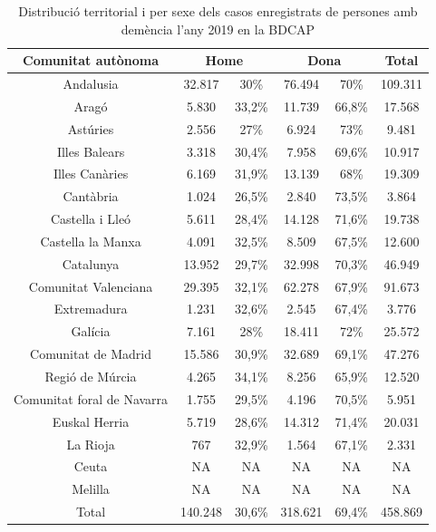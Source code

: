 \documentclass[a4paper,12pt]{report}
\begin{document}
\begin{table}[h]
    \centering
    \begin{tabular}{ |c | c | c | c | c | c | } 
        \hline
        \hline Comunitat autònoma & \multicolumn{2}{|c|}{Home} & \multicolumn{2}{|c|}{Dona} & Total\\
        \hline
        Andalusia & 32.817 & 30\% & 76.494 & 70\% & 109.311\\
        \hline
        Aragó & 5.830 & 33,2\% & 11.739 & 66,8\% & 17.568\\
        \hline
        Astúries & 2.556 & 27\% & 6.924 & 73\% & 9.481\\
        \hline
        Illes Balears & 3.318 & 30,4\% & 7.958 & 69,6\% & 10.917\\
        \hline
        Illes Canàries & 6.169 & 31,9\% & 13.139 & 68\% & 19.309\\
        \hline
        Cantàbria & 1.024 & 26,5\% & 2.840 & 73,5\% & 3.864\\
         \hline
        Castella i Lleó & 5.611 & 28,4\% & 14.128 & 71,6\% & 19.738\\
         \hline
        Castella la Manxa & 4.091 & 32,5\% & 8.509 & 67,5\% & 12.600\\
         \hline
        Catalunya & 13.952 & 29,7\% & 32.998 & 70,3\% & 46.949\\
         \hline
        Comunitat Valenciana & 29.395 & 32,1\% & 62.278 & 67,9\% & 91.673\\
         \hline
        Extremadura & 1.231 & 32,6\% & 2.545 & 67,4\% & 3.776\\
         \hline
        Galícia & 7.161 & 28\% & 18.411 & 72\% & 25.572\\
         \hline
        Comunitat de Madrid & 15.586 & 30,9\% & 32.689 & 69,1\% & 47.276\\
         \hline
        Regió de Múrcia & 4.265 & 34,1\% & 8.256 & 65,9\% & 12.520\\
         \hline
        Comunitat foral de Navarra & 1.755 & 29,5\% & 4.196 & 70,5\% & 5.951\\
         \hline
        Euskal Herria & 5.719 & 28,6\% & 14.312 & 71,4\% & 20.031\\
         \hline
        La Rioja & 767 & 32,9\% & 1.564 & 67,1\% & 2.331\\
         \hline
        Ceuta & NA & NA & NA & NA & NA\\
        \hline
        Melilla & NA & NA & NA & NA & NA\\
        \hline
        Total & 140.248 & 30,6\% & 318.621 & 69,4\% & 458.869\\
        \hline
    \end{tabular}
    \caption{Distribució territorial i per sexe dels casos enregistrats de persones amb demència l'any 2019 en la BDCAP}
    \label{tab:taula2}
\end{table}
\end{document}
